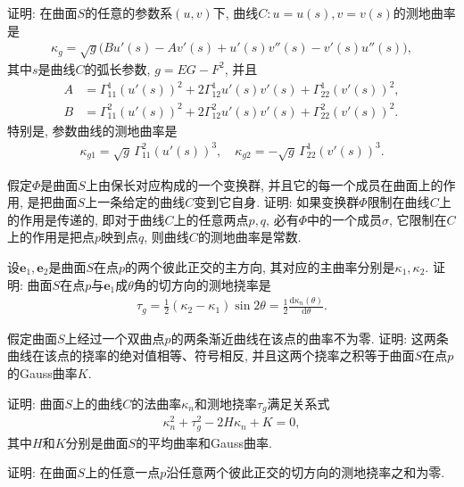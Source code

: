 \documentclass[../../main.tex]{subfiles}%
\begin{document}
\begin{example}
证明: 在曲面$S$的任意的参数系$(u,v)$下, 曲线$C:u=u(s),v=v(s)$的测地曲率是
\begin{align*}
\kappa_g=\sqrt{g}\big(Bu'(s)-Av'(s)+u'(s)v''(s)-v'(s)u''(s)\big),
\end{align*}
其中$s$是曲线$C$的弧长参数, $g=EG-F^2$, 并且
\begin{align*}
A&=\Gamma_{11}^1(u'(s))^2+2\Gamma_{12}^1u'(s)v'(s)+\Gamma_{22}^1(v'(s))^2,\\
B&=\Gamma_{11}^2(u'(s))^2+2\Gamma_{12}^2u'(s)v'(s)+\Gamma_{22}^2(v'(s))^2.
\end{align*}
特别是, 参数曲线的测地曲率是
\begin{align*}
\kappa_{g1}=\sqrt{g}\,\Gamma_{11}^2(u'(s))^3,\quad \kappa_{g2}=-\sqrt{g}\,\Gamma_{22}^1(v'(s))^3.
\end{align*}
\end{example}

\begin{example}
假定$\Phi$是曲面$S$上由保长对应构成的一个变换群, 并且它的每一个成员在曲面上的作用, 是把曲面$S$上一条给定的曲线$C$变到它自身. 证明: 如果变换群$\Phi$限制在曲线$C$上的作用是传递的, 即对于曲线$C$上的任意两点$p,q$, 必有$\Phi$中的一个成员$\sigma$, 它限制在$C$上的作用是把点$p$映到点$q$, 则曲线$C$的测地曲率是常数.
\end{example}

\begin{example}
设$\bm{e}_1,\bm{e}_2$是曲面$S$在点$p$的两个彼此正交的主方向, 其对应的主曲率分别是$\kappa_1,\kappa_2$. 证明: 曲面$S$在点$p$与$\bm{e}_1$成$\theta$角的切方向的测地挠率是
\begin{align*}
\tau_g=\frac{1}{2}(\kappa_2-\kappa_1)\sin2\theta=\frac{1}{2}\frac{\mathrm{d}\kappa_n(\theta)}{\mathrm{d}\theta}.
\end{align*}
\end{example}

\begin{example}
假定曲面$S$上经过一个双曲点$p$的两条渐近曲线在该点的曲率不为零. 证明: 这两条曲线在该点的挠率的绝对值相等、符号相反, 并且这两个挠率之积等于曲面$S$在点$p$的Gauss曲率$K$.
\end{example}

\begin{example}
证明: 曲面$S$上的曲线$C$的法曲率$\kappa_n$和测地挠率$\tau_g$满足关系式
\begin{align*}
\kappa_n^2+\tau_g^2-2H\kappa_n+K=0,
\end{align*}
其中$H$和$K$分别是曲面$S$的平均曲率和Gauss曲率.
\end{example}

\begin{example}
证明: 在曲面$S$上的任意一点$p$沿任意两个彼此正交的切方向的测地挠率之和为零.
\end{example}
\end{document}
